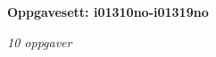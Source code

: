 \centerline{\bf Oppgavesett: i01310no-i01319no}
\vskip 10pt
\centerline{\it 10 oppgaver}\vskip 10pt
\vskip 10pt
